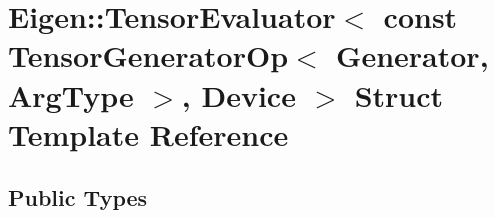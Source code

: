 \hypertarget{struct_eigen_1_1_tensor_evaluator_3_01const_01_tensor_generator_op_3_01_generator_00_01_arg_type_01_4_00_01_device_01_4}{}\section{Eigen\+:\+:Tensor\+Evaluator$<$ const Tensor\+Generator\+Op$<$ Generator, Arg\+Type $>$, Device $>$ Struct Template Reference}
\label{struct_eigen_1_1_tensor_evaluator_3_01const_01_tensor_generator_op_3_01_generator_00_01_arg_type_01_4_00_01_device_01_4}
\subsection*{Public Types}
